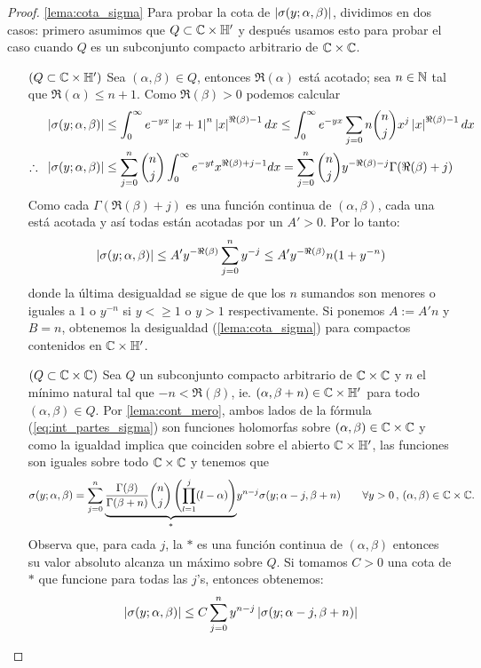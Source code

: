 \begin{proof}\ref{lema:cota_sigma}
Para probar la cota de $\left| \sigma(y;\alpha,\beta) \right|$, dividimos en dos casos: primero asumimos que
$Q\subset\mathbb{C}\times\mathbb{H}'$ y despu\'es usamos esto para probar el caso cuando
$Q$ es un subconjunto compacto arbitrario de $\mathbb{C}\times\mathbb{C}$.
\begin{itemize}
\item[$(Q\subset\mathbb{C}\times\mathbb{H}')$] Sea $(\alpha,\beta)\in Q$, entonces $\Re(\alpha)$ est\'a acotado;
  sea $n\in\mathbb{N}$ tal que $\Re(\alpha)\leq n+1$. Como $\Re(\beta)>0$ podemos calcular
  \begin{align*}
    \left| \sigma(y;\alpha,\beta) \right|
    &\leq\int_0^{\infty}e^{-yx}\left| x+1 \right|^n\left| x \right|^{\Re(\beta)-1}dx\leq
      \int_0^{\infty}e^{-yx}\sum_{j=0}n\binom{n}{j}x^j\left| x \right|^{\Re(\beta)-1}dx\\
    \therefore\;\;\left| \sigma(y;\alpha,\beta) \right|
    &\leq \sum_{j=0}^n\binom{n}{j}\int_0^{\infty}e^{-yt}x^{\Re(\beta)+j-1}dx=
      \sum_{j=0}^n\binom{n}{j}y^{-\Re(\beta)-j}\Gamma(\Re(\beta)+j)
  \end{align*}
  Como cada $\Gamma(\Re(\beta)+j)$ es una funci\'on continua de $(\alpha,\beta)$, cada
  una est\'a acotada y as\'i todas est\'an acotadas por un $A'>0$. Por lo tanto:
  \[
    \left| \sigma(y;\alpha,\beta) \right|\leq A'y^{-\Re(\beta)}\sum_{j=0}^ny^{-j}\leq A'y^{-\Re(\beta)}n(1+y^{-n})
  \]
  donde la \'ultima desigualdad se sigue de que los $n$ sumandos son menores o iguales a
  $1$ o $y^{-n}$ si $y<\geq1$ o $y>1$ respectivamente. Si ponemos $A:=A'n$ y $B=n$, obtenemos
  la desigualdad (\ref{lema:cota_sigma}) para compactos contenidos en $\mathbb{C}\times\mathbb{H}'$.
  
\item[$(Q\subset\mathbb{C}\times\mathbb{C})$] Sea $Q$ un subconjunto compacto arbitrario de $\mathbb{C}\times\mathbb{C}$
  y $n$ el m\'inimo natural tal que $-n<\Re(\beta)$, ie. $(\alpha,\beta+n)\in\mathbb{C}\times\mathbb{H}'$
  para todo $(\alpha,\beta)\in Q$.  Por \ref{lema:cont_mero}, ambos lados de la f\'ormula
  (\ref{eq:int_partes_sigma}) son funciones holomorfas sobre $(\alpha,\beta)\in\mathbb{C}\times\mathbb{C}$
  y como la igualdad implica que coinciden sobre el abierto $\mathbb{C}\times\mathbb{H}'$, las funciones
  son iguales sobre todo $\mathbb{C}\times\mathbb{C}$ y tenemos que
  \[
    \sigma(y;\alpha,\beta)=\sum_{j=0}^n\underset{*}{\underbrace{\frac{\Gamma(\beta)}{\Gamma(\beta+n)}
    \binom{n}{j}\left( \prod_{l=1}^j(l-\alpha) \right)}}y^{n-j}\sigma(y;\alpha-j,\beta+n)
    \qquad\forall y>0\, ,\, (\alpha,\beta)\in\mathbb{C}\times\mathbb{C}.
  \]
  Observa que, para cada $j$, la $*$ es una funci\'on continua de $(\alpha,\beta)$ entonces su
  valor absoluto alcanza un m\'aximo sobre $Q$. Si tomamos $C>0$ una cota de $*$ que funcione
  para todas las $j$'s, entonces obtenemos:
  \begin{equation}\label{deq:paso_inter}
    \left| \sigma(y;\alpha,\beta) \right|\leq C\sum_{j=0}^ny^{n-j}\left| \sigma(y;\alpha-j,\beta+n) \right|
  \end{equation}
  

\end{itemize}
\end{proof}
